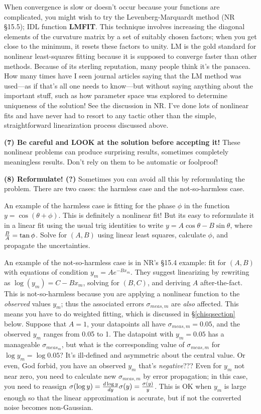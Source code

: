 \documentclass[psfig,preprint]{aastex}
\begin{document}
	When convergence is slow or doesn't occur because your functions
are complicated, you might wish to try the Levenberg-Marquardt method
(NR \S 15.5); IDL function {\bf LMFIT}.  This technique involves
increasing the diagonal elements of the curvature matrix by a set of
suitably chosen factors; when you get close to the minimum, it resets
these factors to unity.  LM is the gold standard for nonlinear
least-squares fitting because it is supposed to converge faster than
other methods.  Because of its sterling reputation, many people think
it's the panacea.  How many times have I seen journal articles saying
that the LM method was used---as if that's all one needs to know---but
without saying anything about the important stuff, such as how parameter
space was explored to determine uniqueness of the solution! See the
discussion in NR.  I've done lots of nonlinear fits and have never had
to resort to any tactic other than the simple, straightforward
linearization process discussed above. 

	{\bf (7) Be careful and LOOK at the solution before accepting
it!} These nonlinear problems can produce surprising results, sometimes
completely meaningless results. Don't rely on them to be automatic or
foolproof!

        {\bf (8) Reformulate! (?)} Sometimes you can avoid all this by
reformulating the problem. There are two cases: the harmless case and
the not-so-harmless case.

        An example of the harmless case is fitting for the phase $\phi$
in the function $y = \cos( \theta + \phi)$.  This is definitely a
nonlinear fit! But its easy to reformulate it in a linear fit using the
usual trig identities to write $y = A \cos \theta - B \sin \theta$,
where ${B \over A} = \tan \phi$.  Solve for $(A,B)$ using linear least
squares, calculate $\phi$, and propagate the uncertainties. 

        An example of the not-so-harmless case is in NR's \S 15.4
example: fit for $(A,B)$ with equations of condition $y_m = A
e^{-Bx_m}$.  They suggest linearizing by rewriting as $\log (y_m) = C -
Bx_m$, solving for $(B,C)$, and deriving $A$ after-the-fact.  This is
not-so-harmless because you are applying a nonlinear function to the
{\it observed} values $y_m$; thus the associated errors
$\sigma_{meas,m}$ are {\it also} affected.  This means you have to do
weighted fitting, which is discussed in \S \ref{chisqsection} below. 
Suppose that $A=1$, your datapoints all have $\sigma_{meas,m} = 0.05$,
and the observed $y_m$ ranges from 0.05 to 1.  The datapoint with $y_m =
0.05$ has a manageable $\sigma_{meas_m}$, but what is the corresponding
value of $\sigma_{meas,m}$ for $\log y_m = \log 0.05$? It's ill-defined
and asymmetric about the central value.  Or even, God forbid, you have
an observed $y_m$ that's {\it negative}??? Even for $y_m$ not near zero,
you need to calculate new $\sigma_{meas,m}$ by error propagation; in
this case, you need to reassign $\sigma(\log y) = {d \log y \over dy}
\sigma(y) = {\sigma(y) \over y}$.  This is OK when $y_m$ is large enough
so that the linear approximation is accurate, but if not the converted
noise becomes non-Gaussian. 
\end{document}
